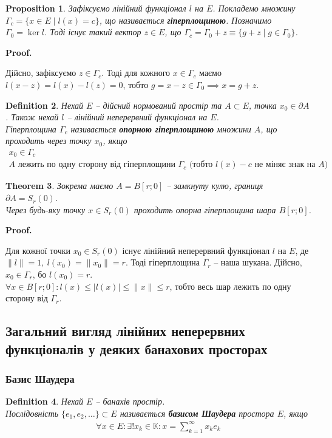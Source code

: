 \documentclass[a4paper, 10pt]{article}
\makeatletter
\theoremstyle{theoremdd}
\newtheorem{theorem}{Theorem}[subsection]
\theoremstyle{theoremdd}
\newtheorem{definition}[theorem]{Definition}
\theoremstyle{theoremdd}
\theoremstyle{theoremdd}
\theoremstyle{theoremdd}
\newtheorem{proposition}[theorem]{Proposition}
\theoremstyle{theoremdd}
\theoremstyle{theoremdd}
\theoremstyle{theoremdd}
\renewenvironment{proof}[1][Proof.\\]{\par
\pushQED{\hfill \qed}%
\normalfont \topsep6\p@\@plus6\p@\relax
\trivlist
\item\relax
{\bfseries
#1\@addpunct{.}}\hspace\labelsep\ignorespaces
}{%
\popQED\endtrivlist\@endpefalse
}
\makeatother
\begin{document}
\begin{proposition}
Зафіксуємо лінійний функціонал $l$ на $E$. Покладемо множину $\Gamma_c = \{x \in E \mid l(x) = c\}$, що називається \textbf{гіперплощиною}. Позначимо $\Gamma_0 = \ker l$. Тоді існує такий вектор $z \in E$, що $\Gamma_c = \Gamma_0 + z \equiv \{g + z \mid g \in \Gamma_0 \}$.
\end{proposition}

\begin{proof}
Дійсно, зафіксуємо $z \in \Gamma_c$. Тоді для кожного $x \in \Gamma_c$ маємо $l(x-z) = l(x) - l(z) = 0$, тобто $g = x-z \in \Gamma_0 \implies x = g +z$.
\end{proof}

\begin{definition}
Нехай $E$ -- дійсний нормований простір та $A \subset E$, точка $x_0 \in \partial A$. Також нехай $l$ -- лінійний неперервний функціонал на $E$.\\
Гіперплощина $\Gamma_c$ називається \textbf{опорною гіперплощиною} множини $A$, що проходить через точку $x_0$, якщо
\begin{align*}
x_0 \in \Gamma_c \\
A \text{ лежить по одну сторону від гіперплощини } \Gamma_c \text{ (тобто $l(x) - c$ не міняє знак на $A$)}
\end{align*}
\end{definition}

\begin{theorem}
Зокрема маємо $A = B[r;0]$ -- замкнуту кулю, границя $\partial A = S_r(0)$.\\
Через будь-яку точку $x \in S_r(0)$ проходить опорна гіперплощина шара $B[r;0]$.
\end{theorem}

\begin{proof}
Для кожної точки $x_0 \in S_r(0)$ існує лінійний неперервний функціонал $l$ на $E$, де $\|l\| = 1,\ l(x_0) = \|x_0\| = r$. Тоді гіперплощина $\Gamma_r$ -- наша шукана. Дійсно, $x_0 \in \Gamma_r$, бо $l(x_0) = r$.\\
$\forall x \in B[r;0]: l(x) \leq |l(x)| \leq \|x\| \leq r$, тобто весь шар лежить по одну сторону від $\Gamma_r$.
\end{proof}

\subsection{Загальний вигляд лінійних неперервних функціоналів у деяких банахових просторах}
\subsubsection{Базис Шаудера}
\begin{definition}
Нехай $E$ -- банахів простір.\\
Послідовність $\{e_1,e_2,\dots\} \subset E$ називається \textbf{базисом Шаудера} простора $E$, якщо
\begin{align*}
\forall x \in E: \exists ! x_k \in \mathbb{K}: x = \displaystyle\sum_{k=1}^\infty x_k e_k
\end{align*}
\end{definition}
\end{document}

